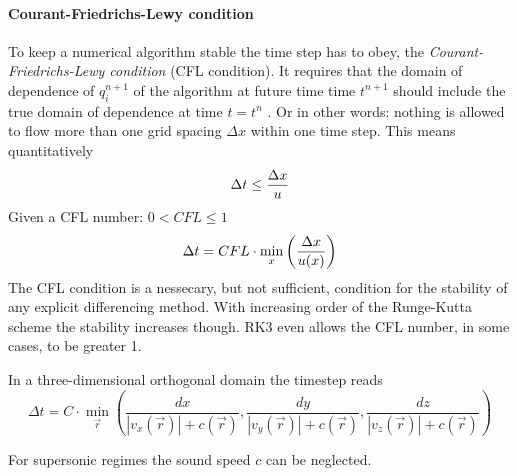\paragraph{Courant-Friedrichs-Lewy condition}
To keep a numerical algorithm stable the time step has to obey, the
\emph{Courant-Friedrichs-Lewy condition} (CFL condition). It requires that the
domain of dependence of $q_i^{n+1}$ of the algorithm at future time time
$t^{n+1}$ should include the true domain of dependence at time $t = t^n$ . Or in
other words: nothing is allowed to flow more than one grid spacing $\Delta x$
within one time step. This means quantitatively
\begin{equation}
    \Delta t \le \frac{\Delta x}{u}
\end{equation}
Given a CFL number: $0 < CFL \le 1$
\begin{equation}
    \Delta t = CFL \cdot \min_{x}\left(\frac{\Delta x}{u(x)}\right)
\end{equation}
The CFL condition is a nessecary, but not sufficient, condition for the
stability of any explicit differencing method. With increasing order of the
Runge-Kutta scheme the stability increases though. RK3 even allows the CFL
number, in some cases, to be greater 1.

In a three-dimensional orthogonal domain the timestep reads
\begin{equation}
    \Delta t = C \cdot \min_{\vec{r}}\left(
        \frac{dx}{|v_x(\vec{r})|+c(\vec{r})},
        \frac{dy}{|v_y(\vec{r})|+c(\vec{r})},
        \frac{dz}{|v_z(\vec{r})|+c(\vec{r})}\right)
\end{equation}

For supersonic regimes the sound speed $c$ can be neglected.
